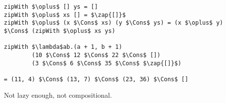 \begin{frame}[t,fragile]
\vspace{35pt}


\begin{lstlisting}[mathescape=true,numbers=none]
zipWith $\oplus$ [] ys = []
zipWith $\oplus$ xs [] = $\zap{[]}$
zipWith $\oplus$ (x $\Cons$ xs) (y $\Cons$ ys) = (x $\oplus$ y) $\Cons$ (zipWith $\oplus$ xs ys)

zipWith $\lambda$ab.(a + 1, b + 1)
        (10 $\Cons$ 12 $\Cons$ 22 $\Cons$ [])
        (3 $\Cons$ 6 $\Cons$ 35 $\Cons$ $\zap{[]}$)

= (11, 4) $\Cons$ (13, 7) $\Cons$ (23, 36) $\Cons$ []
\end{lstlisting}

\vspace{5pt}
\pause Not lazy enough, not compositional.

\end{frame}
